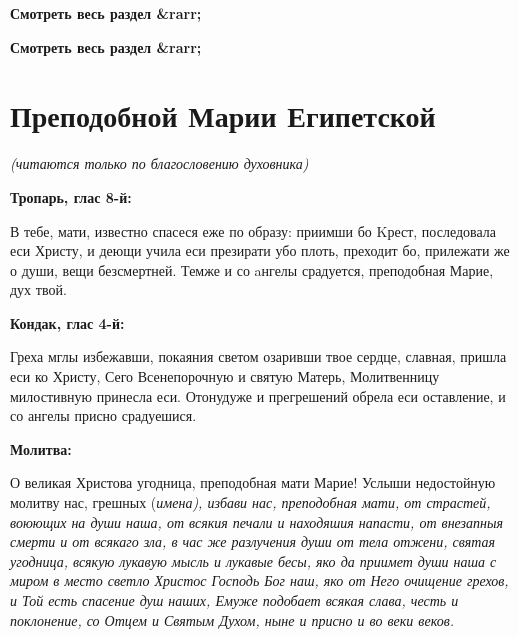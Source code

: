


\bfseries Смотреть весь раздел &rarr;\normalfont{} 


\bfseries Смотреть весь раздел &rarr;\normalfont{} 

\section{Преподобной Марии Египетской}
 


\itshape (читаются только по благословению духовника)\normalfont{}


\medskip


\bfseries Тропарь, глас 8-й:\normalfont{}


В тебе, мати, известно спасеся еже по образу: приимши бо Kрест, последовала еси Христу, и деющи учила еси презирати убо плоть, преходит бо, прилежати же о души, вещи безсмертней. Темже и со aнгелы срадуется, преподобная Марие, дух твой.


\medskip


\bfseries Кондак, глас 4-й:\normalfont{}


Греха мглы избежавши, покаяния светом озаривши твое сердце, славная, пришла еси ко Христу, Сего Всенепорочную и святую Матерь, Молитвенницу милостивную принесла еси. Отонудуже и прегрешений обрела еси оставление, и со ангелы присно срадуешися.


\medskip


\bfseries Молитва:\normalfont{}


О великая Христова угодница, преподобная мати Марие! Услыши недостойную молитву нас, грешных (\itshape имена\normalfont{}), избави нас, преподобная мати, от страстей, воюющих на души наша, от всякия печали и находяшия напасти, от внезапныя смерти и от всякаго зла, в час же разлучения души от тела отжени, святая угодница, всякую лукавую мысль и лукавые бесы, яко да приимет души наша с миром в место светло Христос Господь Бог наш, яко от Него очищение грехов, и Той есть спасение душ наших, Емуже подобает всякая слава, честь и поклонение, со Отцем и Святым Духом, ныне и присно и во веки веков.


